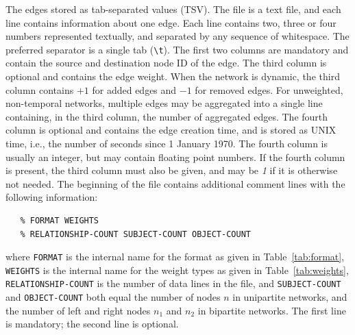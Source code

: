 \documentclass{article}
\begin{document}
The edges stored as tab-separated values (TSV).  The file is a text
file, and each line contains information about one edge.  Each line
contains two, three or four numbers represented textually, and separated
by any sequence of whitespace.  The preferred separator is a single tab (\texttt{\textbackslash{t}}).
The first two columns are mandatory and contain the source and
destination node ID of the edge.  The third column is optional and
contains the edge weight.  When the network is dynamic, the third column
contains $+1$ for added edges and $-1$ for removed edges.  For
unweighted, non-temporal networks, multiple edges may be aggregated into
a single line containing, in the third column, the number of aggregated
edges.  The fourth column is optional and contains the edge creation
time, and is stored as UNIX time, i.e., the number of seconds since 1
January 1970.  The fourth column is usually an integer, but may contain
floating point numbers.  If the fourth column is present, the third
column must also be given, and may be \emph{1} if it is otherwise not
needed.  The beginning of the file contains  
additional comment lines with the following information:
\begin{verbatim}
   % FORMAT WEIGHTS 
   % RELATIONSHIP-COUNT SUBJECT-COUNT OBJECT-COUNT
\end{verbatim}
where \texttt{FORMAT} is the internal name for the format as given
in Table~\ref{tab:format}, \texttt{WEIGHTS} is the internal name for
the weight types as given in Table~\ref{tab:weights},
\texttt{RELATIONSHIP-COUNT} is the number of data lines in the file,
and \texttt{SUBJECT-COUNT} and \texttt{OBJECT-COUNT} both equal the
number of nodes $n$ in unipartite networks, and the number of left
and right nodes $n_1$ and $n_2$ in bipartite networks.  The first
line is mandatory; the second line is optional.
\end{document}
